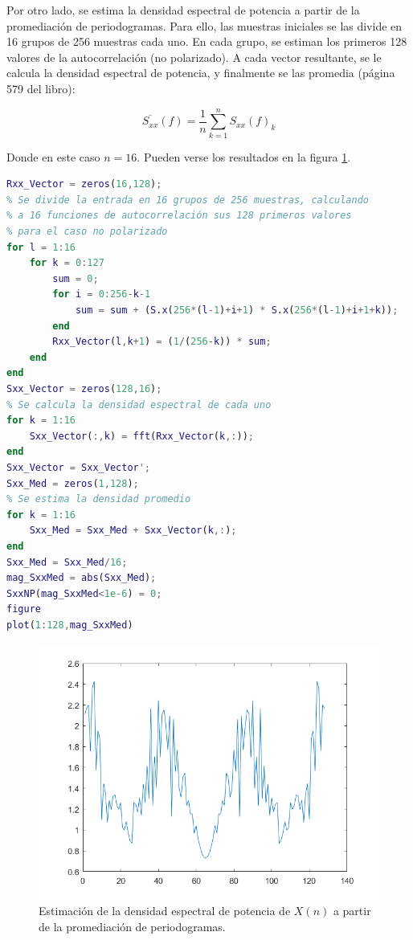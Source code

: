 Por otro lado, se estima la densidad espectral de potencia a partir de la promediaci\'on de periodogramas. Para ello, las muestras iniciales se las divide en 16 grupos de 256 muestras cada uno. En cada grupo, se estiman los primeros 128 valores de la autocorrelación (no polarizado). A cada vector resultante, se le calcula la densidad espectral de potencia, y finalmente se las promedia (página 579 del libro): 

\[
\overline{S_{xx}}(f) = \frac{1}{n} \sum_{k=1}^n S_{xx}(f)_k
\]

Donde en este caso $n=16$. Pueden verse los resultados en la figura \ref{perio}.

\begin{lstlisting}[language=Matlab, caption=EJ1.m]
% Por periodogramas
Rxx_Vector = zeros(16,128);
% Se divide la entrada en 16 grupos de 256 muestras, calculando
% a 16 funciones de autocorrelación sus 128 primeros valores
% para el caso no polarizado
for l = 1:16
    for k = 0:127
        sum = 0;
        for i = 0:256-k-1
            sum = sum + (S.x(256*(l-1)+i+1) * S.x(256*(l-1)+i+1+k));
        end
        Rxx_Vector(l,k+1) = (1/(256-k)) * sum;
    end
end
Sxx_Vector = zeros(128,16);
% Se calcula la densidad espectral de cada uno
for k = 1:16
    Sxx_Vector(:,k) = fft(Rxx_Vector(k,:));
end
Sxx_Vector = Sxx_Vector';
Sxx_Med = zeros(1,128);
% Se estima la densidad promedio
for k = 1:16
    Sxx_Med = Sxx_Med + Sxx_Vector(k,:);
end
Sxx_Med = Sxx_Med/16;
mag_SxxMed = abs(Sxx_Med);
SxxNP(mag_SxxMed<1e-6) = 0;
figure
plot(1:128,mag_SxxMed)
\end{lstlisting}


\begin{figure}[H] %
\centering
\includegraphics[scale=0.45]{../EJ1/periodogramaNP}
\caption{Estimaci\'on de la densidad espectral de potencia de $X(n)$ a partir de la promediaci\'on de periodogramas.}
\label{perio}
\end{figure}


